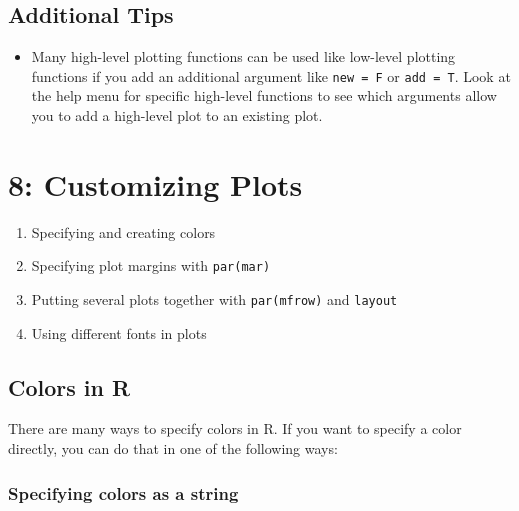 \documentclass{tufte-book}\usepackage[]{graphicx}\usepackage[]{color}
\begin{document}
\begin{footnotesize}
\section{Additional Tips}

\begin{itemize}
  
  \item Many high-level plotting functions can be used like low-level plotting functions if you add an additional argument like \texttt{new = F} or \texttt{add = T}. Look at the help menu for specific high-level functions to see which arguments allow you to add a high-level plot to an existing plot.
  

\end{itemize}






\chapter{8: Customizing Plots}
\label{ch:8}

\begin{enumerate}

  \item Specifying and creating colors
  \item Specifying plot margins with \texttt{par(mar)}
  \item Putting several plots together with \texttt{par(mfrow)} and \texttt{layout}
  \item Using different fonts in plots

\end{enumerate}



\section{Colors in R}

There are many ways to specify colors in R. If you want to specify a color directly, you can do that in one of the following ways:

\subsection{Specifying colors as a string}
  

\end{footnotesize}
\end{document}
